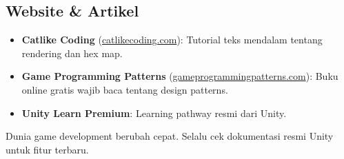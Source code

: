 \subsection{Website \& Artikel}
\begin{itemize}
    \item \textbf{Catlike Coding} (\url{catlikecoding.com}): Tutorial teks mendalam tentang rendering dan hex map.
    \item \textbf{Game Programming Patterns} (\url{gameprogrammingpatterns.com}): Buku online gratis wajib baca tentang design patterns.
    \item \textbf{Unity Learn Premium}: Learning pathway resmi dari Unity.
\end{itemize}

\begin{catatan}
Dunia game development berubah cepat. Selalu cek dokumentasi resmi Unity untuk fitur terbaru.
\end{catatan}
